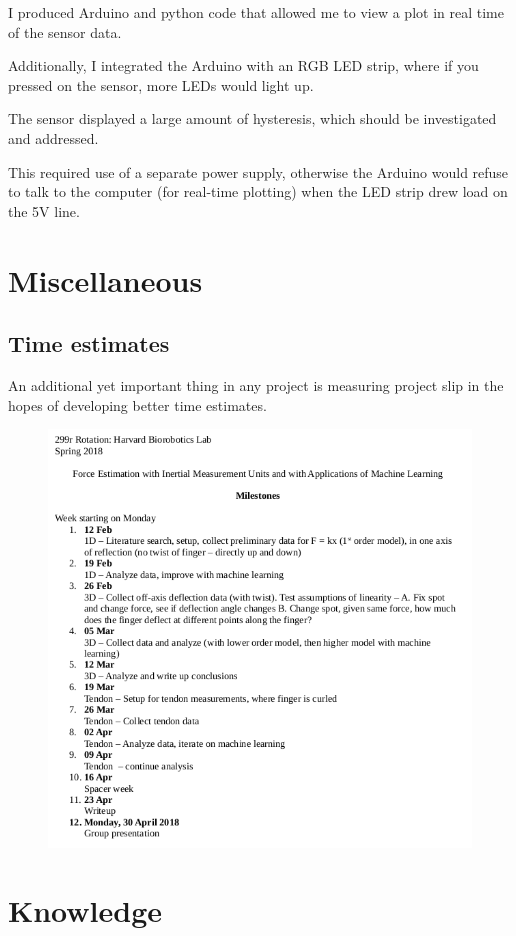 \documentclass[preprint,12pt,3p]{elsarticle}
\begin{document}
I produced Arduino and python code that allowed me to view a plot in real time of the sensor data.

Additionally, I integrated the Arduino with an RGB LED strip, where if you pressed on the sensor,
more LEDs would light up.

The sensor displayed a large amount of hysteresis, which should be investigated and addressed.

This required use of a separate power supply, otherwise the Arduino would refuse to talk to the
computer (for real-time plotting) when the LED strip drew load on the 5V line.

\section{Miscellaneous}
\subsection{Time estimates}

An additional yet important thing in any project is measuring project slip in the hopes of
developing better time estimates. 

\begin{figure}[H]
\centering
\includegraphics[width=.8\textwidth]{images/misc/timeline.png}
\end{figure}


\section{Knowledge}
\end{document}
